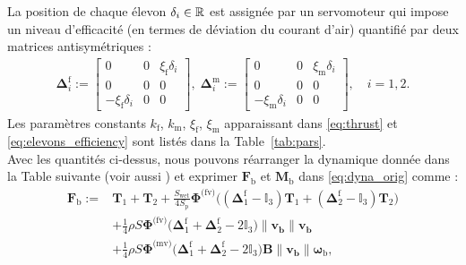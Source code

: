 La position de chaque élevon $\delta_i \in {\mathbb R}$ est assignée par un servomoteur qui impose un niveau d'efficacité (en termes de déviation du courant d'air) quantifié par deux matrices antisymétriques :
\begin{align}
\label{eq:elevons_efficiency}
    \boldsymbol{\Delta}^{\text{f}}_{i} \!:=\! \begin{bmatrix} 0 & 0 & \xi_{\text{f}}\delta_{i} \\ 0 & 0 & 0 \\ -\xi_{\text{f}}\delta_{i} & 0 & 0 \end{bmatrix}\! ,\;
    \boldsymbol{\Delta}^{\text{m}}_{i} \!:=\! \begin{bmatrix} 0 & 0 & \xi_{\text{m}}\delta_{i} \\ 0 & 0 & 0 \\ -\xi_{\text{m}}\delta_{i} & 0 & 0 \end{bmatrix} \!, \quad i=1,2.
\end{align}
 Les paramètres constants $k_{\text{f}}$, $k_{\text{m}}$, $\xi_{\text{f}}$, $\xi_{\text{m}}$ apparaissant dans \eqref{eq:thrust} et \eqref{eq:elevons_efficiency} sont listés dans la Table~\ref{tab:pars}.\\
Avec les quantités ci-dessus, nous pouvons réarranger la dynamique donnée dans la Table suivante \cite[eqns (97),~(98)]{lustosaHal-03035938} (voir aussi \cite{sansouStage}) et exprimer $\boldsymbol{F}_{\text{b}}$ et $\boldsymbol{M}_{\text{b}}$ dans \eqref{eq:dyna_orig} comme :
%
\begin{align}
\nonumber
    \boldsymbol{F}_{\text{b}} :={}&  \boldsymbol{T}_{1} + \boldsymbol{T}_{2} + \frac{S_{\text{wet}}}{4S_{\text{p}}} \boldsymbol{\Phi}^{\text{(fv)}} \Big( (\boldsymbol{\Delta}^{\text{f}}_1 - \mathbb{I}_{3} ) \boldsymbol{T}_{1} + ( \boldsymbol{\Delta}^{\text{f}}_2 - \mathbb{I}_{3}) \boldsymbol{T}_{2}\Big) \\ 
     \label{eq:Fb}
    &+ \frac{1}{4} \rho S  \boldsymbol{\Phi}^{\text{(fv)}} \Big(\boldsymbol{\Delta}^{\text{f}}_1+ \boldsymbol{\Delta}^{\text{f}}_2 - 2 \mathbb{I}_{3} \Big) \lVert \boldsymbol{v_{\text{b}}} \rVert \boldsymbol{v_{\text{b}}}\\
    \nonumber
    &+ \frac{1}{4} \rho S \boldsymbol{\Phi}^{\text{(mv)}} \Big(\boldsymbol{\Delta}^{\text{f}}_1 + \boldsymbol{\Delta}^{\text{f}}_2 - 2\mathbb{I}_{3}\Big) \boldsymbol{B} \lVert \boldsymbol{v_{\text{b}}} \rVert  \boldsymbol{\omega}_{\text{b}}, 
\end{align}
